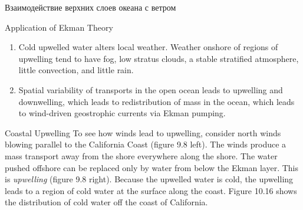 \begin{chapter}{Взаимодействие верхних слоев океана с ветром}
\begin{section}{Application of Ekman Theory}
\begin{enumerate}
\item 
Cold upwelled water alters local weather. Weather onshore of regions
of upwelling tend to have fog,
low stratus clouds, a stable stratified atmosphere, little convection,
and little rain.
%

\item 
Spatial variability of transports in the open ocean leads to
upwelling and downwelling, which
leads to redistribution of mass in the ocean, which leads to
wind-driven geostrophic currents via Ekman pumping.
%
\end{enumerate}

\begin{paragraph}{Coastal Upwelling}
To see how winds lead to
upwelling, consider north winds blowing
parallel to the California Coast (figure 9.8 left). The winds produce
a mass transport away from the shore
everywhere along the shore. The water pushed offshore can be replaced
only by water from below the Ekman layer. This is
\textit{upwelling} (figure 9.8 right). Because
the upwelled water is cold, the upwelling leads to a region of cold
water at the surface along the coast. Figure 10.16 shows the
distribution of cold water off the coast of California.
%


\end{paragraph}
\end{section}
\end{chapter}

